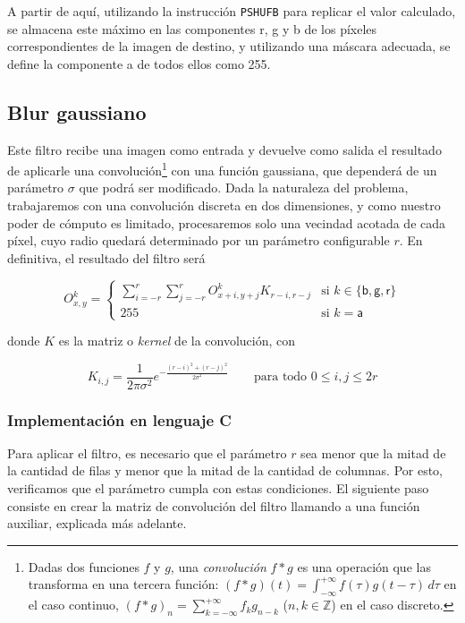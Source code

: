      A partir de aquí, utilizando la instrucción \texttt{PSHUFB} para replicar el valor calculado, se almacena este máximo en las componentes \textsf{r}, \textsf{g} y \textsf{b} de los píxeles correspondientes de la imagen de destino, y utilizando una máscara adecuada, se define la componente \textsf{a} de todos ellos como 255.

  \subsection{Blur gaussiano}
    Este filtro recibe una imagen como entrada y devuelve como salida el resultado de aplicarle una convolución\footnote{Dadas dos funciones $f$ y $g$, una \emph{convolución} $f * g$ es una operación que las transforma en una tercera función: $(f * g)(t) = \int_{-\infty}^{+\infty} f(\tau) g(t - \tau) \,d\tau$ en el caso continuo, $(f * g)_n = \sum_{k=-\infty}^{+\infty} f_k g_{n-k}$ ($n, k \in \mathbb{Z}$) en el caso discreto.} con una función gaussiana, que dependerá de un parámetro $\sigma$ que podrá ser modificado. Dada la naturaleza del problema, trabajaremos con una convolución discreta en dos dimensiones, y como nuestro poder de cómputo es limitado, procesaremos solo una vecindad acotada de cada píxel, cuyo radio quedará determinado por un parámetro configurable $r$. En definitiva, el resultado del filtro será

    \[ O_{x,y}^k = \begin{cases}
      \displaystyle \sum_{i=-r}^r \sum_{j=-r}^r O_{x+i,y+j}^k K_{r-i,r-j}
        & \text{si } k \in \lbrace \mathsf{b, g, r} \rbrace \\
      255
        & \text{si } k = \mathsf{a}
    \end{cases} \]

    donde $K$ es la matriz o \emph{kernel} de la convolución, con

    \[ K_{i,j} = \frac{1}{2 \pi \sigma^2} e^{- \frac{(r-i)^2 + (r-j)^2}{2 \sigma^2}} \qquad \text{para todo } 0 \leq i,j \leq 2r \]

    \subsubsection{Implementación en lenguaje C}

      Para aplicar el filtro, es necesario que el parámetro $r$ sea menor que la mitad de la cantidad de filas y menor que la mitad de la cantidad de columnas. Por esto, verificamos que el parámetro cumpla con estas condiciones. El siguiente paso consiste en crear la matriz de convolución del filtro llamando a una función auxiliar, explicada más adelante. 

